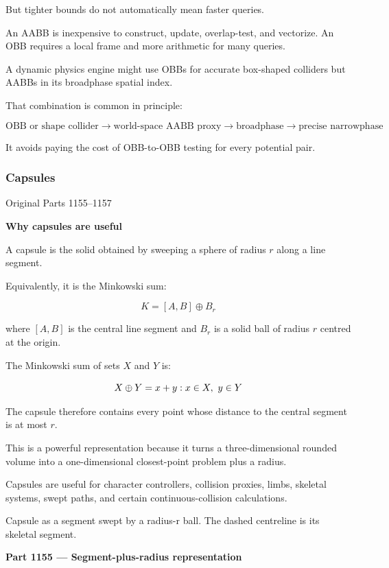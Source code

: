 But tighter bounds do not automatically mean faster queries.

An AABB is inexpensive to construct, update, overlap-test, and vectorize. An OBB requires a local frame and more arithmetic for many queries.

A dynamic physics engine might use OBBs for accurate box-shaped colliders but AABBs in its broadphase spatial index.

That combination is common in principle:

\[
\text{OBB or shape collider} \rightarrow \text{world-space AABB proxy} \rightarrow \text{broadphase} \rightarrow \text{precise narrowphase}
\]

It avoids paying the cost of OBB-to-OBB testing for every potential pair.

\subsubsection{Capsules}\label{capsules}

Original Parts 1155--1157

\textbf{Why capsules are useful}

A capsule is the solid obtained by sweeping a sphere of radius \(r\) along a line segment.

Equivalently, it is the Minkowski sum:

\[
\boxed{ K=[A,B]\oplus B_r }
\]

where \([A,B]\) is the central line segment and \(B_r\) is a solid ball of radius \(r\) centred at the origin.

The Minkowski sum of sets \(X\) and \(Y\) is:

\[
X\oplus Y=\\{x+y:x\in X,\ y\in Y\\}
\]

The capsule therefore contains every point whose distance to the central segment is at most \(r\).

This is a powerful representation because it turns a three-dimensional rounded volume into a one-dimensional closest-point problem plus a radius.

Capsules are useful for character controllers, collision proxies, limbs, skeletal systems, swept paths, and certain continuous-collision calculations.

Capsule as a segment swept by a radius-r ball. The dashed centreline is its skeletal segment.

\textbf{Part 1155 --- Segment-plus-radius representation}

